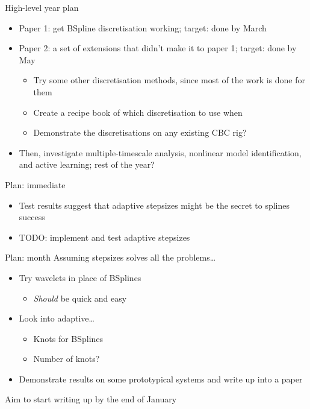 \documentclass[presentation]{beamer}
\begin{document}
\begin{frame}[label={sec:orgebe8d45}]{High-level year plan}
\begin{itemize}
\item Paper 1: get BSpline discretisation working; target: done by March
\end{itemize}
\vfill
\begin{itemize}
\item Paper 2: a set of extensions that didn't make it to paper 1; target: done by May
\begin{itemize}
\item Try some other discretisation methods, since most of the work is done for them
\item Create a recipe book of which discretisation to use when
\item Demonstrate the discretisations on any existing CBC rig?
\end{itemize}
\end{itemize}
\vfill
\begin{itemize}
\item Then, investigate multiple-timescale analysis, nonlinear model identification, and active learning; rest of the year?
\end{itemize}
\end{frame}
\begin{frame}[label={sec:org7902545}]{Plan: immediate}
\begin{itemize}
\item Test results suggest that adaptive stepsizes might be the secret to splines success
\item TODO: implement and test adaptive stepsizes
\end{itemize}
\end{frame}

\begin{frame}[label={sec:orgd35567d}]{Plan: month}
Assuming stepsizes solves all the problems\ldots{}
\vfill
\begin{itemize}
\item Try wavelets in place of BSplines
\begin{itemize}
\item \emph{Should} be quick and easy
\end{itemize}
\item Look into adaptive\ldots{}
\begin{itemize}
\item Knots for BSplines
\item Number of knots?
\end{itemize}
\item Demonstrate results on some prototypical systems and write up into a paper
\end{itemize}
\vfill
Aim to start writing up by the end of January
\end{frame}
\end{document}
